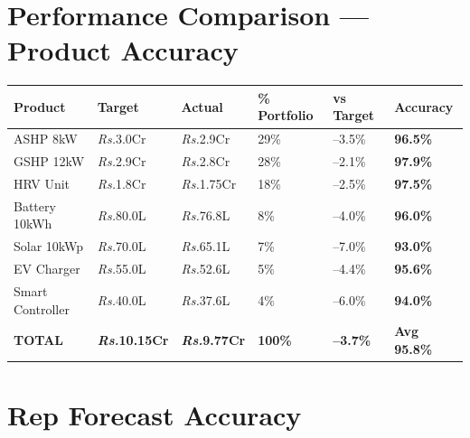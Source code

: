 \documentclass[12pt,a4paper]{report}
\newcommand{\rupee}{\textit{\textsf{\small Rs.}}}
\newcommand{\badgegreen}[1]{\colorbox{aspcvgreen!20}{\color{aspcvgreen}\small\textbf{#1}}}
\newcommand{\badgeorange}[1]{\colorbox{aspcvorange!20}{\color{aspcvorange}\small\textbf{#1}}}
\newcommand{\badgeblue}[1]{\colorbox{aspcvaccent!20}{\color{aspcvaccent}\small\textbf{#1}}}
\begin{document}
\clearpage

\section{Performance Comparison --- Product Accuracy}

\vspace{4pt}
\begin{center}
\begin{tabular}{L{3.2cm} R{2.3cm} R{2.3cm} C{2cm} C{1.8cm} C{2cm}}
\toprule
{}
\color{white}\textbf{Product} &
\color{white}\textbf{Target} &
\color{white}\textbf{Actual} &
\color{white}\textbf{\% Portfolio} &
\color{white}\textbf{vs Target} &
\color{white}\textbf{Accuracy} \\
\midrule
{} ASHP 8kW         & \rupee{}3.0Cr  & \rupee{}2.9Cr  & 29\% & \textcolor{aspcvred}{--3.5\%}  & \badgegreen{96.5\%} \\
GSHP 12kW         & \rupee{}2.9Cr  & \rupee{}2.8Cr  & 28\% & \textcolor{aspcvred}{--2.1\%}  & \badgegreen{97.9\%} \\
 HRV Unit          & \rupee{}1.8Cr  & \rupee{}1.75Cr & 18\% & \textcolor{aspcvred}{--2.5\%}  & \badgegreen{97.5\%} \\
Battery 10kWh     & \rupee{}80.0L  & \rupee{}76.8L  & 8\%  & \textcolor{aspcvred}{--4.0\%}  & \badgegreen{96.0\%} \\
 Solar 10kWp       & \rupee{}70.0L  & \rupee{}65.1L  & 7\%  & \textcolor{aspcvred}{--7.0\%}  & \badgeorange{93.0\%} \\
EV Charger        & \rupee{}55.0L  & \rupee{}52.6L  & 5\%  & \textcolor{aspcvred}{--4.4\%}  & \badgegreen{95.6\%} \\
 Smart Controller  & \rupee{}40.0L  & \rupee{}37.6L  & 4\%  & \textcolor{aspcvred}{--6.0\%}  & \badgeorange{94.0\%} \\
\midrule
{}
\textbf{TOTAL} & \textbf{\rupee{}10.15Cr} & \textbf{\rupee{}9.77Cr} & \textbf{100\%} & \textbf{\textcolor{aspcvred}{--3.7\%}} & \badgeblue{Avg 95.8\%} \\
\bottomrule
\end{tabular}
\end{center}

\vspace{10mm}

\section{Rep Forecast Accuracy}
\end{document}
